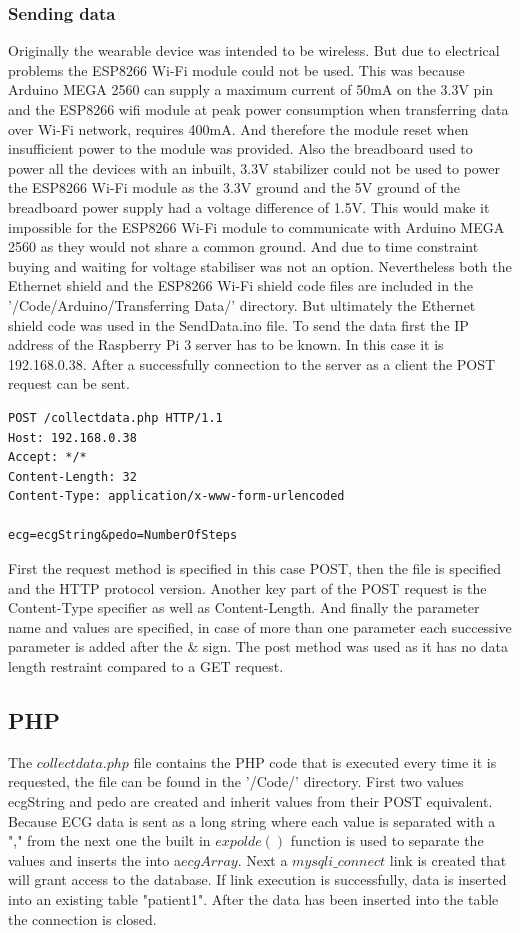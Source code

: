 \documentclass[12pt,]{article}
\numberwithin{figure}{section}
\begin{document}
\subsubsection{Sending data}
Originally the wearable device was intended to be wireless. But due to electrical problems the ESP8266 Wi-Fi module could not be used. This was because Arduino MEGA 2560 can supply a maximum current of 50mA on the 3.3V pin and the ESP8266 wifi module at peak power consumption when transferring data over Wi-Fi network, requires 400mA. And therefore the module reset when insufficient power to the module was provided. Also the breadboard used to power all the devices with an inbuilt, 3.3V stabilizer could not be used to power the ESP8266 Wi-Fi module as the 3.3V ground and the 5V ground of the breadboard power supply had a voltage difference of 1.5V. This would make it impossible for the ESP8266 Wi-Fi module to communicate with Arduino MEGA 2560 as they would not share a common ground. And due to time constraint buying and waiting for voltage stabiliser was not an option. Nevertheless both the Ethernet shield and the ESP8266 Wi-Fi shield code files are included in the '/Code/Arduino/Transferring Data/' directory. But ultimately the Ethernet shield code was used in the SendData.ino file. To send the data first the IP address of the Raspberry Pi 3 server has to be known. In this case it is 192.168.0.38. After a successfully connection to the server as a client the POST request can be sent. 
\begin{verbatim}
POST /collectdata.php HTTP/1.1
Host: 192.168.0.38
Accept: */*
Content-Length: 32
Content-Type: application/x-www-form-urlencoded

ecg=ecgString&pedo=NumberOfSteps
\end{verbatim}
First the request method is specified in this case POST, then the file is specified and the HTTP protocol version. Another key part of the POST request is the Content-Type specifier as well as Content-Length. And finally the parameter name and values are specified, in case of more than one parameter each successive parameter is added after the \& sign. The post method was used as it has no data length restraint compared to a GET request.
\subsection{PHP}
The $collectdata.php$ file contains the PHP code that is executed every time it is requested, the file can be found in the '/Code/' directory. First two values ecgString and pedo are created and inherit values from their POST equivalent. Because ECG data is sent as a long string where each value is separated with a "," from the next one the built in $expolde()$ function is used to separate the values and inserts the into a$ecgArray$. Next a $mysqli\_connect$ link is created that will grant access to the database. If link execution is successfully, data is inserted into an existing table "patient1". After the data has been inserted into the table the connection is closed.
\end{document}
